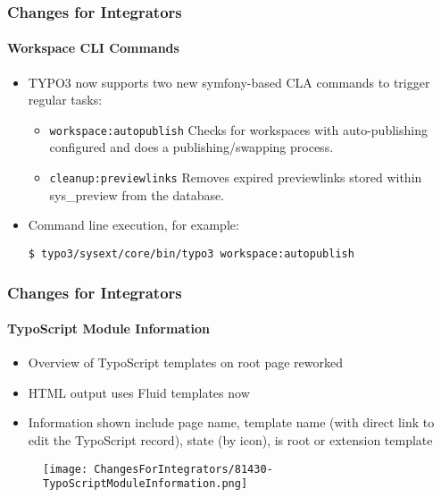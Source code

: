 
\begin{frame}[fragile]
	\frametitle{Changes for Integrators}
	\framesubtitle{Workspace CLI Commands}

	\lstset{basicstyle=\small\ttfamily}

	\begin{itemize}
		\item TYPO3 now supports two new symfony-based CLA commands to trigger
			regular tasks:

			\begin{itemize}

				\item \texttt{workspace:autopublish}\newline
					Checks for workspaces with auto-publishing configured
					and does a publishing/swapping process.
					\newline

				\item \texttt{cleanup:previewlinks}\newline
					Removes expired previewlinks stored within sys\_preview
					from the database.

			\end{itemize}

		\item Command line execution, for example:

			\begin{lstlisting}
$ typo3/sysext/core/bin/typo3 workspace:autopublish
			\end{lstlisting}

	\end{itemize}

\end{frame}


\begin{frame}[fragile]
	\frametitle{Changes for Integrators}
	\framesubtitle{TypoScript Module Information}

	\begin{itemize}
		\item Overview of TypoScript templates on root page reworked
		\item HTML output uses Fluid templates now
		\item Information shown include page name, template name (with direct
			link to edit the TypoScript record), state (by icon), is root or
			extension template

	\end{itemize}

	\begin{figure}
		\texttt{[image: ChangesForIntegrators/81430-TypoScriptModuleInformation.png]}
	\end{figure}

\end{frame}

